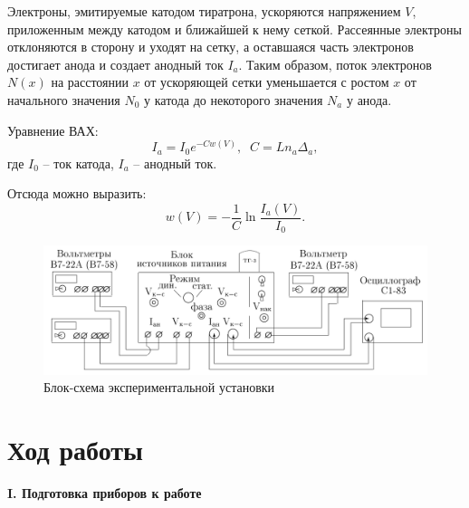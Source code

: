 \documentclass[12pt,a4paper]{article}
\begin{document}
	Электроны, эмитируемые катодом тиратрона, ускоряются напряжением $V$, приложенным между катодом и ближайшей к нему сеткой. Рассеянные электроны отклоняются в сторону и уходят на сетку, а оставшаяся часть электронов достигает анода и создает анодный ток $I_a$. Таким образом, поток электронов $N(x)$ на расстоянии $x$ от ускоряющей сетки уменьшается с ростом $x$ от начального значения $N_0$ у катода до некоторого
	значения $N_a$ у анода.
	
	Уравнение ВАХ:
	\begin{equation}
		I_a = I_0 e^{-C w(V)}, \;\; C = L n_a \Delta_a,
	\end{equation}
	где $I_0$ -- ток катода, $I_a$ -- анодный ток.
	
	Отсюда можно выразить:
	\begin{equation}
		w(V) = -\frac{1}{C} \ln\frac{I_a(V)}{I_0}.
		\label{w}
	\end{equation}
	
	\begin{figure}[h!]
		\centering
		\includegraphics[width=1.0\linewidth]{res/4.png}
		\caption{Блок-схема экспериментальной установки}
	\end{figure}

\section*{Ход работы}

\begin{center}
		\textbf{I. Подготовка приборов к работе}
	\end{center}
\end{document}

